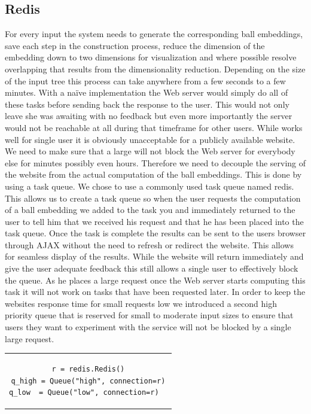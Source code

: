 \documentclass[]{article}
\begin{document}
\subsection{Redis}
\label{sec::redis}
For every input the system needs to generate the corresponding ball embeddings, save each step in the construction process, reduce the dimension of the embedding down to two dimensions for visualization and where possible resolve overlapping that results from the dimensionality reduction. Depending on the size of the input tree this process can take anywhere from a few seconds to a few minutes. With a naïve implementation the Web server would simply do all of these tasks before sending back the response to the user. This would not only leave she was awaiting with no feedback but even more importantly the server would not be reachable at all during that timeframe for other users. While works well for single user it is obviously unacceptable for a publicly available website. We need to make sure that a large will not block the Web server for everybody else for minutes possibly even hours. Therefore we need to decouple the serving of the website from the actual computation of the ball embeddings. This is done by using a task queue.
We chose to use a commonly used task queue named redis. This allows us to create a task queue so when the user requests the computation of a ball embedding we added to the task you and immediately returned to the user to tell him that we received his request and that he has been placed into the task queue. Once the task is complete the results can be sent to the users browser through AJAX without the need to refresh or redirect the website. This allows for seamless display of the results. While the website will return immediately and give the user adequate feedback this still allows a single user to effectively block the queue. As he places a large request once the Web server starts computing this task it will not work on tasks that have been requested later. In order to keep the websites response time for small requests low we introduced a second high priority queue that is reserved for small to moderate input sizes to ensure that users they want to experiment with the service will not be blocked by a single large request.
\begin{center}


\begin{tabular}{c}
\begin{lstlisting}
r = redis.Redis()
q_high = Queue("high", connection=r)
q_low  = Queue("low", connection=r)  
\end{lstlisting}
\end{tabular}
\end{center}
\end{document}
